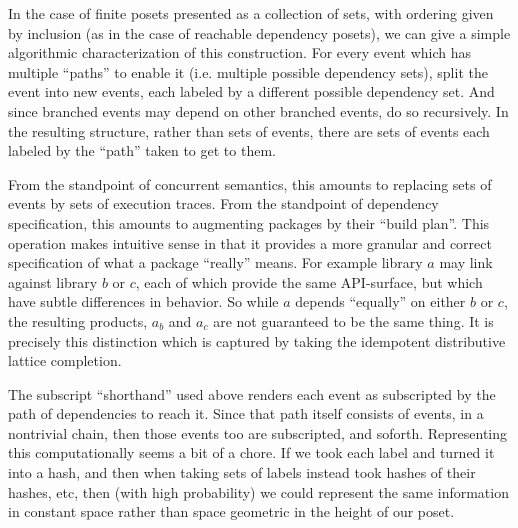 \documentclass[hoptionsi,review,screen,format=sigconf]{acmart}
\theoremstyle{definition}
\begin{document}
In the case of finite posets presented as a collection of sets, with ordering given by inclusion (as in the case of reachable dependency posets), we can give a simple algorithmic characterization of this construction. For every event which has multiple ``paths'' to enable it (i.e. multiple possible dependency sets), split the event into new events, each labeled by a different possible dependency set. And since branched events may depend on other branched events, do so recursively. In the resulting structure, rather than sets of events, there are sets of events each labeled by the ``path'' taken to get to them. 

From the standpoint of concurrent semantics, this amounts to replacing sets of events by sets of execution traces. From the standpoint of dependency specification, this amounts to augmenting packages by their ``build plan''. This operation makes intuitive sense in that it provides a more granular and correct specification of what a package ``really'' means. For example library \(a\) may link against library \(b\) or \(c\), each of which provide the same API-surface, but which have subtle differences in behavior. So while \(a\) depends ``equally'' on either \(b\) or \(c\), the resulting products, \(a_b\) and \(a_c\) are not guaranteed to be the same thing. It is precisely this distinction which is captured by taking the idempotent distributive lattice completion.

The subscript ``shorthand'' used above renders each event as subscripted by the path of dependencies to reach it. Since that path itself consists of events, in a nontrivial chain, then those events too are subscripted, and soforth. Representing this computationally seems a bit of a chore. If we took each label and turned it into a hash, and then when taking sets of labels instead took hashes of their hashes, etc, then (with high probability) we could represent the same information in constant space rather than space geometric in the height of our poset.
\end{document}
